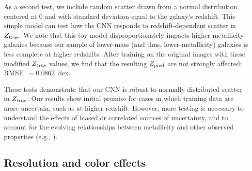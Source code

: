 \documentclass[fleqn,usenatbib]{mnras}
\newcommand{\eg}{e.g.}
\newcommand{\citeeg}[1]{(\eg, \citealt{#1})}
\begin{document}
As a second test, we include random scatter drawn from a normal distribution centered at 0 and with standard deviation equal to the galaxy's redshift. This simple model can test how the CNN responds to redshift-dependent scatter in $Z_{\rm true}$. We note that this toy model disproportionately impacts higher-metallicity galaxies because our sample of lower-mass (and thus, lower-metallicity) galaxies is less complete at higher redshifts. After training on the original images with these modified $Z_{\rm true}$ values, we find that the resulting $Z_{\rm pred}$ are not strongly affected: RMSE~$= 0.0862$~dex.
	
These tests demonstrate that our CNN is robust to normally distributed scatter in $Z_{\rm true}$. Our results show initial promise for cases in which training data are more uncertain, such as at higher redshift. However, more testing is necessary to understand the effects of biased or correlated sources of uncertainty, and to account for the evolving relationships between metallicity and other observed properties \citeeg{Zahid2013,Salim2015}.


\subsection{Resolution and color effects} \label{sec:resolution}
\end{document}
